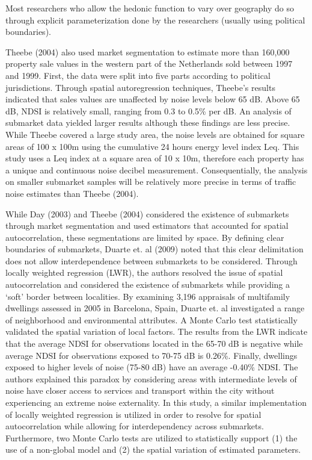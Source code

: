 \documentclass{article}\usepackage{graphicx, color}
\begin{document}
Most researchers who allow the hedonic function to vary over geography do so through explicit parameterization done by the researchers (usually using political boundaries).

Theebe (2004) also used market segmentation to estimate more than 160,000 property sale values in the western part of the Netherlands sold between 1997 and 1999.  First, the data were split into five parts according to political jurisdictions. Through spatial autoregression techniques, Theebe’s results indicated that sales values are unaffected by noise levels below 65 dB. Above 65 dB, NDSI is relatively small, ranging from 0.3 to 0.5\% per dB. An analysis of submarket data yielded larger results although these findings are less precise. While Theebe covered a large study area, the noise levels are obtained for square areas of 100 x 100m using the cumulative 24 hours energy level index Leq. This study uses a Leq index at a square area of 10 x 10m, therefore each property has a unique and continuous noise decibel measurement. Consequentially, the analysis on smaller submarket samples will be relatively more precise in terms of traffic noise estimates than Theebe (2004).

While Day (2003) and Theebe (2004) considered the existence of submarkets through market segmentation and used estimators that accounted for spatial autocorrelation, these segmentations are limited by space. By defining clear boundaries of submarkets, Duarte et. al (2009) noted that this clear delimitation does not allow interdependence between submarkets to be considered. Through locally weighted regression (LWR), the authors resolved the issue of spatial autocorrelation and considered the existence of submarkets while providing a ‘soft’ border between localities. By examining 3,196 appraisals of multifamily dwellings assessed in 2005 in Barcelona, Spain, Duarte et. al investigated a range of neighborhood and environmental attributes.  A Monte Carlo test statistically validated the spatial variation of local factors. The results from the LWR indicate that the average NDSI for observations located in the 65-70 dB is negative  while average NDSI for observations exposed to 70-75 dB is 0.26\%. Finally, dwellings exposed to higher levels of noise (75-80 dB) have an average -0.40\% NDSI. The authors explained this paradox by considering areas with intermediate levels of noise have closer access to services and transport within the city without experiencing an extreme noise externality. In this study, a similar implementation of locally weighted regression is utilized in order to resolve for spatial autocorrelation while allowing for interdependency across submarkets. Furthermore, two Monte Carlo tests are utilized to statistically support (1) the use of a non-global model and (2) the spatial variation of estimated parameters. 
\end{document}
